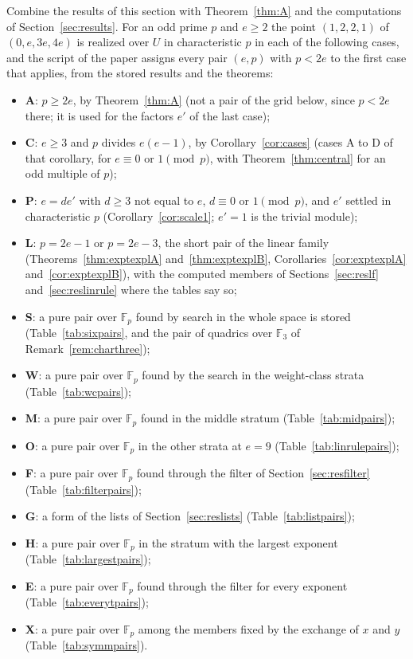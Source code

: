 \documentclass[11pt]{article}
\theoremstyle{definition}
\theoremstyle{remark}
\newcommand{\F}{\mathbb{F}}
\begin{document}
Combine the results of this section with Theorem~\ref{thm:A} and the computations of Section~\ref{sec:results}. For an odd prime $p$ and $e\ge2$ the point $(1,2,2,1)$ of $(0,e,3e,4e)$ is realized over $U$ in characteristic $p$ in each of the following cases, and the script of the paper assigns every pair $(e,p)$ with $p<2e$ to the first case that applies, from the stored results and the theorems:
\begin{itemize}
\item \textbf{A}: $p\ge2e$, by Theorem~\ref{thm:A} (not a pair of the grid below, since $p<2e$ there; it is used for the factors $e'$ of the last case);
\item \textbf{C}: $e\ge3$ and $p$ divides $e(e-1)$, by Corollary~\ref{cor:cases} (cases A to D of that corollary, for $e\equiv0$ or $1\pmod p$, with Theorem~\ref{thm:central} for an odd multiple of $p$);
\item \textbf{P}: $e=de'$ with $d\ge3$ not equal to $e$, $d\equiv0$ or $1\pmod p$, and $e'$ settled in characteristic $p$ (Corollary~\ref{cor:scale1}; $e'=1$ is the trivial module);
\item \textbf{L}: $p=2e-1$ or $p=2e-3$, the short pair of the linear family (Theorems~\ref{thm:exptexplA} and~\ref{thm:exptexplB}, Corollaries~\ref{cor:exptexplA} and~\ref{cor:exptexplB}), with the computed members of Sections~\ref{sec:reslf} and~\ref{sec:reslinrule} where the tables say so;
\item \textbf{S}: a pure pair over $\F_p$ found by search in the whole space is stored (Table~\ref{tab:sixpairs}, and the pair of quadrics over $\F_3$ of Remark~\ref{rem:charthree});
\item \textbf{W}: a pure pair over $\F_p$ found by the search in the weight-class strata (Table~\ref{tab:wcpairs});
\item \textbf{M}: a pure pair over $\F_p$ found in the middle stratum (Table~\ref{tab:midpairs});
\item \textbf{O}: a pure pair over $\F_p$ in the other strata at $e=9$ (Table~\ref{tab:linrulepairs});
\item \textbf{F}: a pure pair over $\F_p$ found through the filter of Section~\ref{sec:resfilter} (Table~\ref{tab:filterpairs});
\item \textbf{G}: a form of the lists of Section~\ref{sec:reslists} (Table~\ref{tab:listpairs});
\item \textbf{H}: a pure pair over $\F_p$ in the stratum with the largest exponent (Table~\ref{tab:largestpairs});
\item \textbf{E}: a pure pair over $\F_p$ found through the filter for every exponent (Table~\ref{tab:everytpairs});
\item \textbf{X}: a pure pair over $\F_p$ among the members fixed by the exchange of $x$ and $y$ (Table~\ref{tab:symmpairs}).
\end{itemize}
\end{document}

